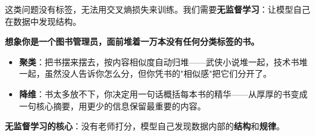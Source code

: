 \documentclass[a4paper,11pt]{ctexart}
\begin{document}
这类问题没有标签，无法用交叉熵损失来训练。我们需要\textbf{无监督学习}：让模型自己在数据中发现结构。

\begin{metaphorbox}
    \textbf{想象你是一个图书管理员，面前堆着一万本没有任何分类标签的书。}

    \begin{itemize}
        \item \textbf{聚类}：把书摆来摆去，按内容相似度自动归堆——武侠小说堆一起，技术书堆一起，虽然没人告诉你怎么分，但你凭书的"相似感"把它们分开了。
        \item \textbf{降维}：书太多放不下，你决定用一句话概括每本书的精华——从厚厚的书变成一句核心摘要，用更少的信息保留最重要的内容。
    \end{itemize}

    \textbf{无监督学习的核心}：没有老师打分，模型自己发现数据内部的\textbf{结构}和\textbf{规律}。
\end{metaphorbox}
\end{document}
